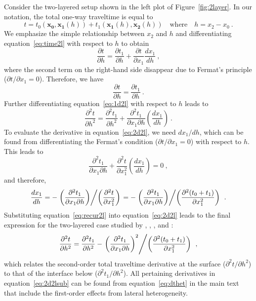 Consider the two-layered setup shown in the left plot of Figure~\ref{fig:2layer}. In our notation, the total one-way traveltime is equal to
\begin{equation}
\label{eq:time2l}
t = t_0(\mathbf{x_0},\mathbf{x_1}(h)) + t_1(\mathbf{x_1}(h),\mathbf{x_2}(h)) \quad\text{where}\quad h = x_2-x_0~.
\end{equation}
We emphasize the simple relationship between $x_2$ and $h$ and differentiating equation~\ref{eq:time2l} with respect to $h$ to obtain  
\begin{equation}
\frac{\partial t}{\partial h} = \frac{\partial t_1}{\partial h} +  \frac{\partial t}{\partial x_1}  \frac{d x_1}{d h}  ~,
\end{equation}
where the second term on the right-hand side disappear due to Fermat's principle ($\partial t / \partial x_1 = 0$). Therefore, we have 
\begin{equation}
\label{eq:1d2l}
\frac{\partial t}{\partial h} = \frac{\partial t_1}{\partial h}  ~.
\end{equation}
Further differentiating equation~\ref{eq:1d2l} with respect to $h$ leads to
\begin{equation}
\label{eq:2d2l}
\frac{\partial^2 t}{\partial h^2} = \frac{\partial^2 t_1}{\partial h^2} + \frac{\partial^2 t_1}{\partial x_1 \partial h}\left( \frac{d x_1}{d h}\right) ~.
\end{equation}
To evaluate the derivative in equation~\ref{eq:2d2l}, we need $d x_1/d h$, which can be found from differentiating the Fermat's condition ($\partial t/ \partial x_1 = 0$) with respect to $h$. This leads to
\begin{equation}
 \frac{\partial^2 t_1 }{ \partial x_1 \partial h} + \frac{\partial^2 t }{ \partial x_1^2} \left( \frac{d x_1}{d h}\right) = 0~,
\end{equation} 
and therefore,
\begin{equation}
\label{eq:recur2l}
 \frac{d x_1}{d h} = - \left. \left(\frac{\partial^2 t_1 }{ \partial x_1 \partial h}\right) \middle/ \left(\frac{\partial^2 t }{ \partial x_1^2} \right) \right. =  - \left. \left(\frac{\partial^2 t_1 }{ \partial x_1 \partial h}\right) \middle/ \left(\frac{\partial^2 (t_0+t_1) }{ \partial x_1^2} \right) \right.  ~.
\end{equation} 
Substituting equation~\ref{eq:recur2l} into equation~\ref{eq:2d2l} leads to the final expression for the two-layered case studied by \cite{blias1981}, \cite{bliasgrit1984}, \cite{gritsenko}, and \cite{goldin}:
\begin{equation}
\label{eq:2d2lsub}
\frac{\partial^2 t}{\partial h^2} = \frac{\partial^2 t_1}{\partial h^2} - \left. \left(\frac{\partial^2 t_1 }{ \partial x_1 \partial h}\right)^2 \middle/ \left(\frac{\partial^2 (t_0+t_1) }{ \partial x_1^2} \right) \right. ~,
\end{equation}
which relates the second-order total traveltime derivative at the surface ($\partial^2 t/\partial h^2$) to that of the interface below ($\partial^2 t_1/\partial h^2$). All pertaining derivatives in equation~\ref{eq:2d2lsub} can be found from equation~\ref{eq:dthet} in the main text that include the first-order effects from lateral heterogeneity. 

